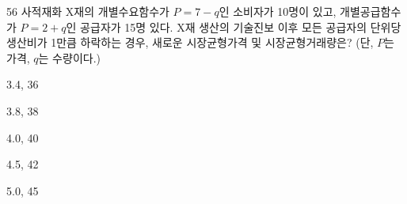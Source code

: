 \begin{question}{56}
사적재화 X재의 개별수요함수가 $P=7-q$인 소비자가 10명이 있고, 개별공급함수가 $P=2+q$인 공급자가 15명 있다. X재 생산의 기술진보 이후 모든 공급자의 단위당 생산비가 1만큼 하락하는 경우, 새로운 시장균형가격 및 시장균형거래량은? (단, $P$는 가격, $q$는 수량이다.)
\begin{choices}
  \item 3.4, 36
  \item 3.8, 38
  \item 4.0, 40
  \item 4.5, 42
  \item 5.0, 45
\end{choices}
\end{question}
